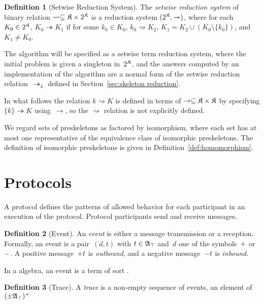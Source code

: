 \documentclass[12pt]{article}
\theoremstyle{definition}
\newtheorem{defn}{Definition}[section]
\begin{document}
\begin{defn}[Setwise Reduction System]
The \emph{setwise reduction system} of binary relation
$\rightsquigarrow\subseteq\mathfrak K\times2^{\mathfrak K}$ is a reduction
system $(2^{\mathfrak K},\twoheadrightarrow)$, where for each
$K_0\in2^{\mathfrak K}$, $K_0\twoheadrightarrow K_1$ if for some $k_0\in
K_0$, $k_0\rightsquigarrow K_2$, $K_1=K_2\cup (K_0\setminus\{k_0\})$,
and $K_1\neq K_0$.
\end{defn}

The {\cpsa} algorithm will be specified as a setwise term reduction
system, where the initial problem is given a singleton
in~$2^{\mathfrak K}$, and the answers computed by an implementation of
the algorithm are a normal form of the setwise reduction
relation~$\twoheadrightarrow_k$ defined in Section~\ref{sec:skeleton
  reduction}.

In what follows the relation $k\rightsquigarrow K$ is defined in terms
of $\to\subseteq\mathfrak K\times\mathfrak K$ by specifying
$\{k\}\twoheadrightarrow K$ using~$\to$, so the $\rightsquigarrow$
relation is not explicitly defined.

We regard sets of preskeletons as factored by isomorphism, where each
set has at most one representative of the equivalence class of
isomorphic preskeletons.  The definition of isomorphic preskeletons
is given in Definition~\ref{def:homomorphism}.

\section{Protocols}\label{sec:protocols}

A protocol defines the patterns of allowed behavior for each
participant in an execution of the protocol.  Protocol participants
send and receive messages.

\begin{defn}[Event]
An \emph{event} is either a message transmission or a reception.
Formally, an event is a pair~$(d,t)$ with $t\in\mathfrak A_{\top}$ and~$d$
one of the symbols~$\mathord +$ or~$\mathord -$.  A positive
message~$\mathord + t$ is \emph{outbound}, and a negative
message~$\mathord - t$ is \emph{inbound.}
\end{defn}

In a {\cpsa} algebra, an event is a term of sort .

\begin{defn}[Trace]
A \emph{trace} is a non-empty sequence of events, an
element of $(\pm\mathfrak A_{\top})^+$
\end{defn}
\end{document}

